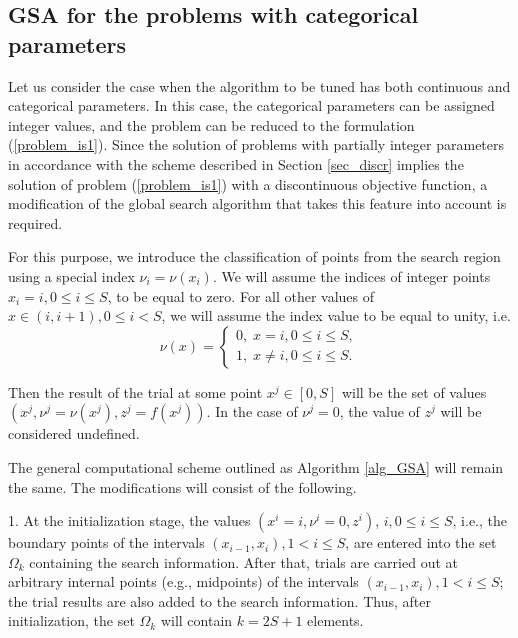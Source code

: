 \documentclass[preprint,12pt]{elsarticle}
\begin{document}
\subsection{GSA for the problems with categorical parameters}
\label{sec_mGSA}

Let us consider the case when the algorithm to be tuned has both continuous and categorical parameters.  In this case, the categorical parameters can be assigned integer values, and the problem can be reduced to the formulation (\ref{problem_is1}).
Since the solution of problems with partially integer parameters in accordance with the scheme described in Section \ref{sec_discr} implies the solution of problem (\ref{problem_is1}) with a discontinuous objective function, a modification of the global search algorithm that takes this feature into account is required.

For this purpose, we introduce the classification of points from the search region using a special index $\nu_i=\nu(x_i)$. We will assume the indices of integer points $x_i = i, 0\leq i \leq S$, to be equal to zero. For all other values of $x\in(i,i+1),  0 \leq i < S$, we will assume the index value to be equal to unity, i.e.  
\begin{equation}\label{index}
	\nu(x) = \left\{
   \begin{array}{lr}
     0, \; x = i, 0\leq i \leq S, \\
     1, \; x \neq i,  0 \leq i \leq S.
   \end{array}
\right.
\end{equation}

Then the result of the trial at some point $x^j\in[0,S]$  will be the set of values $(x^j, \nu^j=\nu(x^j), z^j = f(x^j))$. In the case of  $\nu^j=0$, the value of $z^j$ will be considered undefined.

The general computational scheme outlined as Algorithm \ref{alg_GSA} will remain the same. The modifications will consist of the following.

1. At the initialization stage, the values $(x^i = i, \nu^i=0, z^i)$, $ i, 0\leq i \leq S$, i.e., the boundary points of the intervals $(x_{i-1},x_i), 1<i\leq S$, are entered into the set $\Omega_k$ containing the search  information. 
After that, trials are carried out at arbitrary internal points (e.g., midpoints) of the intervals $(x_{i-1},x_i), 1<i\leq S$; the trial results are also added to the search information. Thus, after initialization, the set $\Omega_k$ will contain $k=2S+1$ elements.
\end{document}
